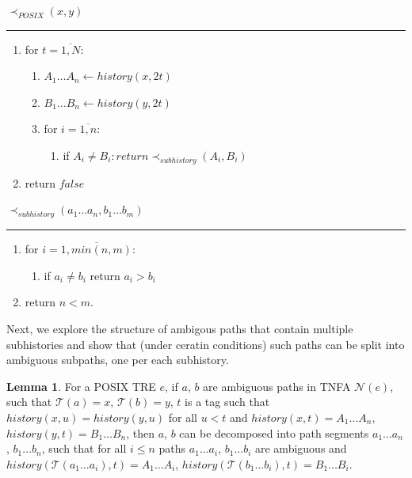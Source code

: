 \documentclass{article}
\newcommand{\Xset}{\!\leftarrow\!}
\newcommand{\Xeq}{\!=\!}
\newcommand{\XN}{\mathcal{N}}
\newcommand{\XT}{\mathcal{T}}
\theoremstyle{definition}
\newtheorem{XLem}{Lemma}
\begin{document}
\begin{multicols}{2}
    $\prec_{POSIX}(x, y)$
    \hrule
    \begin{enumerate}[leftmargin=0in]
        \smallskip
        \item[] for $t \Xeq \overline{1, N}$:
        \begin{enumerate}
            \item[] $A_1 \dots A_n \Xset history(x, 2t)$
            \item[] $B_1 \dots B_n \Xset history(y, 2t)$
            \item[] for $i \Xeq \overline{1, n}$:
            \begin{enumerate}
                \item[] if $A_i \!\neq\! B_i: return \prec_{subhistory} (A_i, B_i)$
            \end{enumerate}
        \end{enumerate}
        \item[] return $false$
        \\
    \end{enumerate}

    \bigskip

    $\prec_{subhistory} (a_1 \dots a_n, b_1 \dots b_m)$
    \hrule
    \begin{enumerate}[leftmargin=0in]
        \smallskip
        \item[] for $i \Xeq \overline{1, min(n, m)}$:
        \begin{enumerate}
            \item[] if $a_i \!\neq\! b_i$ return $a_i \!>\! b_i$
        \end{enumerate}
        \item[] return $n \!<\! m$.
        \\
    \end{enumerate}

    \bigskip

Next, we explore the structure of ambigous paths that contain multiple subhistories
and show that (under ceratin conditions) such paths can be split into ambiguous subpaths,
one per each subhistory.
\\

\begin{XLem}\label{lemma_path_decomposition}
For a POSIX TRE $e$,
if $a$, $b$ are ambiguous paths in TNFA $\XN(e)$, such that $\XT(a) \Xeq x$, $\XT(b) \Xeq y$,
$t$ is a tag such that $history(x, u) \Xeq history(y, u)$ for all $u \!<\! t$
and $history(x, t) \Xeq A_1 \dots A_n$, $history(y, t) \Xeq B_1 \dots B_n$,
then $a$, $b$ can be decomposed into path segments $a_1 \dots a_n$, $b_1 \dots b_n$,
such that for all $i \!\leq\! n$ paths $a_1 \dots a_i$, $b_1 \dots b_i$ are ambiguous
and $history(\XT(a_1 \dots a_i), t) \Xeq A_1 \dots A_i$, $history(\XT(b_1 \dots b_i), t) \Xeq B_1 \dots B_i$.


\end{XLem}
\end{multicols}
\end{document}
